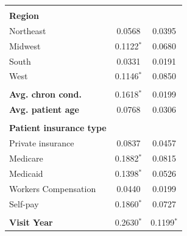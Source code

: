 \documentclass[12pt]{report}
\begin{document}
{\begin{center}
\begin{longtable}{lcc}
                                       &                          &                           \\
\textbf{Region}                        &                          &                           \\
Northeast                              & 0.0568                   & 0.0395                    \\
Midwest                                & 0.1122$^{*}$               & 0.0680                    \\
South                                  & 0.0331                   & 0.0191                    \\
West                                   & 0.1146$^{*}$               & 0.0850                    \\
                                       &                          &                           \\
\textbf{Avg. chron cond.}              & 0.1618$^{*}$               & 0.0199                    \\
\textbf{Avg. patient age}              & 0.0768                   & 0.0306                    \\
                                       &                          &                           \\
\textbf{Patient insurance type}        &                          &                           \\
Private insurance                      & 0.0837                   & 0.0457                    \\
Medicare                               & 0.1882$^{*}$               & 0.0815                    \\
Medicaid                               & 0.1398$^{*}$               & 0.0526                    \\
Workers Compensation                   & 0.0440                   & 0.0199                    \\
Self-pay                               & 0.1860$^{*}$               & 0.0727                    \\
                                       &                          &                           \\
\textbf{Visit Year}                    & 0.2630$^{*}$               & 0.1199$^{*}$    
\end{longtable}
\end{center}}

\newpage


\end{document}
